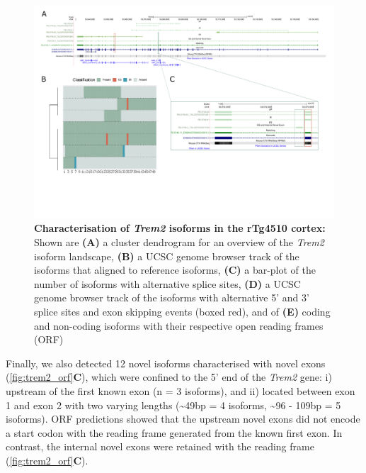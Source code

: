 \begin{landscape}
	\begin{figure}[htp]
		\centering
		\captionsetup{width=1.3\textwidth}
		\includegraphics[page=12,trim={0 2cm 0 0},scale = 0.8]{Figures/TargetGenes_Annotation_Landscape.pdf}
		\caption[Characterisation of \textit{Trem2} isoforms in the rTg4510 cortex]%
		{\textbf{Characterisation of \textit{Trem2} isoforms in the rTg4510 cortex:} Shown are \textbf{(A)} a cluster dendrogram for an overview of the \textit{Trem2} isoform landscape, \textbf{(B)} a UCSC genome browser track of the isoforms that aligned to reference isoforms, \textbf{(C)} a bar-plot of the number of isoforms with alternative splice sites, \textbf{(D)} a UCSC genome browser track of the isoforms with alternative 5' and 3' splice sites and exon skipping events (boxed red), and of \textbf{(E)} coding and non-coding isoforms with their respective open reading frames (ORF) }    
		\label{fig:trem2}
	\end{figure}
\end{landscape}
\restoregeometry 

Finally, we also detected 12 novel isoforms characterised with novel exons (\cref{fig:trem2_orf}\textbf{C}), which were confined to the 5' end of the \textit{Trem2} gene: i)  upstream of the first known exon (n = 3 isoforms), and ii) located between exon 1 and exon 2 with two varying lengths (\textasciitilde49bp = 4 isoforms, \textasciitilde96 - 109bp = 5 isoforms). ORF predictions showed that the upstream novel exons did not encode a start codon with the reading frame generated from the known first exon. In contrast, the internal novel exons were retained with the reading frame (\cref{fig:trem2_orf}\textbf{C}). 

